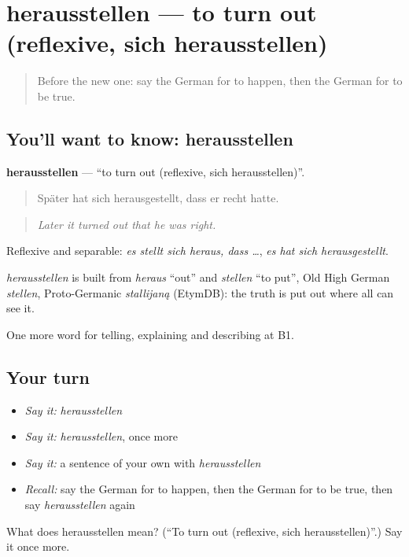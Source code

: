 \section[herausstellen]{herausstellen — to turn out (reflexive, sich herausstellen)}

\label{lesson:GE-C370-herausstellen}



\begin{quote}
Before the new one: say the German for to happen, then the German for to be true.
\end{quote}

\subsection*{You'll want to know: herausstellen}
\textbf{herausstellen} — \textquotedblleft{}to turn out (reflexive, sich herausstellen)\textquotedblright{}.

\begin{quote}
Später hat sich herausgestellt, dass er recht hatte.
\end{quote}

\begin{quote}
\emph{Later it turned out that he was right.}
\end{quote}

Reflexive and separable: \emph{es stellt sich heraus, dass …}, \emph{es hat sich herausgestellt}.

\begin{cousinweb}
\emph{herausstellen} is built from \emph{heraus} \textquotedblleft{}out\textquotedblright{} and \emph{stellen} \textquotedblleft{}to put\textquotedblright{}, Old High German \emph{stellen}, Proto-Germanic \emph{stallijaną} (EtymDB): the truth is put out where all can see it.
\end{cousinweb}

\begin{grammarlens}[title={What you've built}]
One more word for telling, explaining and describing at B1.
\end{grammarlens}

\subsection*{Your turn}
\begin{itemize}
\raggedright
  \item \emph{Say it:} \emph{herausstellen}
  \item \emph{Say it:} \emph{herausstellen}, once more
  \item \emph{Say it:} a sentence of your own with \emph{herausstellen}
  \item \emph{Recall:} say the German for to happen, then the German for to be true, then say \emph{herausstellen} again
\end{itemize}

\begin{tcolorbox}[breakable,colback=teal!4,colframe=teal!35!black,title={Before you move on}]
What does herausstellen mean? (\textquotedblleft{}To turn out (reflexive, sich herausstellen)\textquotedblright{}.) Say it once more.
\end{tcolorbox}
